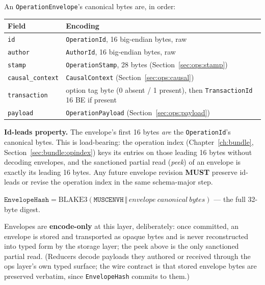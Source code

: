 \documentclass[11pt,letterpaper]{report}
\newcommand{\tablenums}[1]{{\addfontfeatures{Numbers={Lining,Tabular}}#1}}
\newcounter{requirement}[chapter]
\newcommand{\MUST}{\textbf{MUST}}
\newcommand{\cat}{\ensuremath{\,\Vert\,}}
\begin{document}
\begin{requirement}
\label{req:binfmt:envelope}
An \texttt{OperationEnvelope}'s canonical bytes are, in order:

\begin{center}
\begin{tabular}{p{1.35in} p{3.9in}}
  \toprule
  \textbf{Field} & \textbf{Encoding} \\
  \midrule
  \texttt{id} & \texttt{OperationId}, 16 big-endian bytes, raw \\
  \texttt{author} & \texttt{AuthorId}, 16 big-endian bytes, raw \\
  \texttt{stamp} & \texttt{OperationStamp}, 28 bytes
    (Section~\ref{sec:ops:stamp}) \\
  \texttt{causal\_context} & \texttt{CausalContext}
    (Section~\ref{sec:ops:causal}) \\
  \texttt{transaction} & option tag byte (\tablenums{0} absent /
    \tablenums{1} present), then \texttt{TransactionId} 16 BE if present \\
  \texttt{payload} & \texttt{OperationPayload}
    (Section~\ref{sec:ops:payload}) \\
  \bottomrule
\end{tabular}
\end{center}

\textbf{Id-leads property.} The envelope's first 16 bytes \emph{are} the
\texttt{OperationId}'s canonical bytes. This is load-bearing: the operation
index (Chapter~\ref{ch:bundle}, Section~\ref{sec:bundle:opindex}) keys its
entries on those leading 16 bytes without decoding envelopes, and the
sanctioned partial read (\emph{peek}) of an envelope is exactly its leading
16 bytes. Any future envelope revision \MUST{} preserve id-leads or revise
the operation index in the same schema-major step.
\end{requirement}

$\texttt{EnvelopeHash} = \mathrm{BLAKE3}(\texttt{MUSCENVH} \cat
\mathit{envelope\ canonical\ bytes})$ --- the full 32-byte digest.

Envelopes are \textbf{encode-only} at this layer, deliberately: once
committed, an envelope is stored and transported as opaque bytes and is
never reconstructed into typed form by the storage layer; the peek above is
the only sanctioned partial read. (Reducers decode payloads they authored or
received through the ops layer's own typed surface; the wire contract is
that stored envelope bytes are preserved verbatim, since
\texttt{EnvelopeHash} commits to them.)
\end{document}

